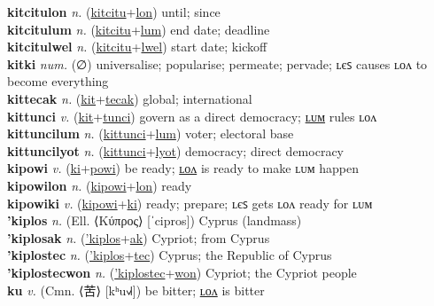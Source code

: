\textbf{kitcitulon} \textit{n.} (\hyperref[kitcitu]{kitcitu}+\hyperref[lon]{lon})
until; since \label{kitcitulon} \\
\textbf{kitcitulum} \textit{n.} (\hyperref[kitcitu]{kitcitu}+\hyperref[lum]{lum})
end date; deadline \label{kitcitulum} \\
\textbf{kitcitulwel} \textit{n.} (\hyperref[kitcitu]{kitcitu}+\hyperref[lwel]{lwel})
start date; kickoff \label{kitcitulwel} \\
\textbf{kitki} \textit{num.} (∅)
universalise; popularise; permeate; pervade; ʟєꜱ causes ʟᴏᴧ to become everything \label{kitki} \\
\textbf{kittecak} \textit{n.} (\hyperref[kit]{kit}+\hyperref[tecak]{tecak})
global; international \label{kittecak} \\
\textbf{kittunci} \textit{v.} (\hyperref[kit]{kit}+\hyperref[tunci]{tunci})
govern as a direct democracy; \hyperref[kittuncilum]{ʟᴜᴍ} rules ʟᴏᴧ \label{kittunci} \\
\textbf{kittuncilum} \textit{n.} (\hyperref[kittunci]{kittunci}+\hyperref[lum]{lum})
voter; electoral base \label{kittuncilum} \\
\textbf{kittuncilyot} \textit{n.} (\hyperref[kittunci]{kittunci}+\hyperref[lyot]{lyot})
democracy; direct democracy \label{kittuncilyot} \\
\textbf{kipowi} \textit{v.} (\hyperref[ki]{ki}+\hyperref[powi]{powi})
be ready; \hyperref[kipowilon]{ʟᴏᴧ} is ready to make ʟᴜᴍ happen \label{kipowi} \\
\textbf{kipowilon} \textit{n.} (\hyperref[kipowi]{kipowi}+\hyperref[lon]{lon})
ready \label{kipowilon} \\
\textbf{kipowiki} \textit{v.} (\hyperref[kipowi]{kipowi}+\hyperref[ki]{ki})
ready; prepare; ʟєꜱ gets ʟᴏᴧ ready for ʟᴜᴍ \label{kipowiki} \\
\textbf{'kiplos} \textit{n.} (Ell. ⟨Κύπρος⟩ [ˈcipros])
Cyprus (landmass) \label{'kiplos} \\
\textbf{'kiplosak} \textit{n.} (\hyperref['kiplos]{'kiplos}+\hyperref[ak]{ak})
Cypriot; from Cyprus \label{'kiplosak} \\
\textbf{'kiplostec} \textit{n.} (\hyperref['kiplos]{'kiplos}+\hyperref[tec]{tec})
Cyprus; the Republic of Cyprus \label{'kiplostec} \\
\textbf{'kiplostecwon} \textit{n.} (\hyperref['kiplostec]{'kiplostec}+\hyperref[won]{won})
Cypriot; the Cypriot people \label{'kiplostecwon} \\
\textbf{ku} \textit{v.} (Cmn. ⟨苦⟩ [kʰu˧˩˧])
be bitter; \hyperref[kulon]{ʟᴏᴧ} is bitter \label{ku} \\
